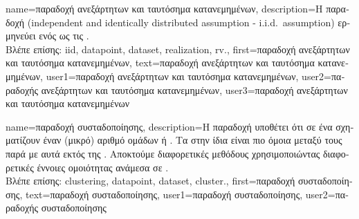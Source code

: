 {name={\foreignlanguage{greek}{παραδοχή ανεξάρτητων και ταυτόσημα κατανεμημένων}}, 
	description={\foreignlanguage{greek}{Η παραδοχή}  
		(independent and identically distributed assumption - i.i.d.\ assumption) \foreignlanguage{greek}{ερμηνεύει}  
		\foreignlanguage{greek}{ενός}  \foreignlanguage{greek}{ως τις}   .\\
		\foreignlanguage{greek}{Βλέπε επίσης:} \gls{iid}, \gls{datapoint}, \gls{dataset}, \gls{realization}, \gls{rv}.},
	first={\foreignlanguage{greek}{παραδοχή ανεξάρτητων και ταυτόσημα κατανεμημένων}},
	text={\foreignlanguage{greek}{παραδοχή ανεξάρτητων και ταυτόσημα κατανεμημένων}},
	user1={\foreignlanguage{greek}{παραδοχή ανεξάρτητων και ταυτόσημα κατανεμημένων}}, %
  	user2={\foreignlanguage{greek}{παραδοχής ανεξάρτητων και ταυτόσημα κατανεμημένων}}, %
	user3={\foreignlanguage{greek}{παραδοχή ανεξάρτητων και ταυτόσημα κατανεμημένων}} %
}

{name={\foreignlanguage{greek}{παραδοχή συσταδοποίησης}}, 
	description={\foreignlanguage{greek}{Η παραδοχή} 
		 \foreignlanguage{greek}{υποθέτει ότι}  \foreignlanguage{greek}{σε 
		ένα}  \foreignlanguage{greek}{σχηματίζουν έναν (μικρό) αριθμό ομάδων ή} . 
		\foreignlanguage{greek}{Τα}  \foreignlanguage{greek}{στην ίδια}  
		\foreignlanguage{greek}{είναι πιο όμοια μεταξύ τους παρά με αυτά εκτός της}  
		\cite{SemiSupervisedBook}. \foreignlanguage{greek}{Αποκτούμε διαφορετικές μεθόδους}  
		\foreignlanguage{greek}{χρησιμοποιώντας διαφορετικές έννοιες ομοιότητας ανάμεσα σε} .\\
		\foreignlanguage{greek}{Βλέπε επίσης:} \gls{clustering}, \gls{datapoint}, \gls{dataset}, \gls{cluster}.},
	first={\foreignlanguage{greek}{παραδοχή συσταδοποίησης}},
	text={\foreignlanguage{greek}{παραδοχή συσταδοποίησης}},
	user1={\foreignlanguage{greek}{παραδοχή συσταδοποίησης}}, %
	user2={\foreignlanguage{greek}{παραδοχής συσταδοποίησης}} %
}

